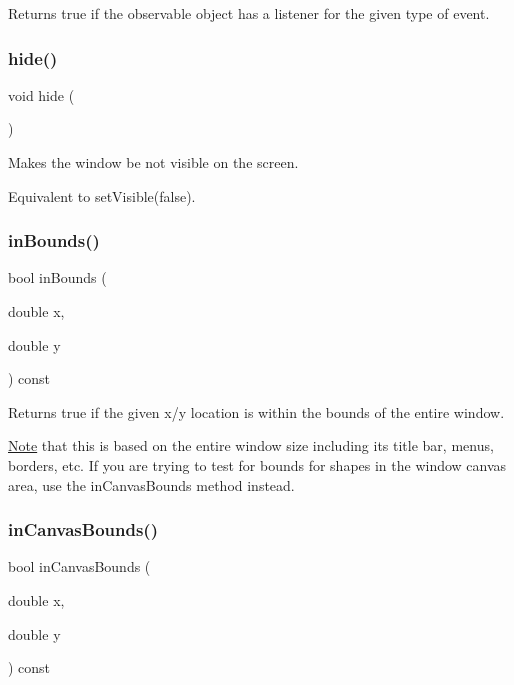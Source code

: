 Returns true if the observable object has a listener for the given type of event. 

\mbox{\label{classGWindow_ade42eb4da4eb77db85a8d1e4b92e7be4}} 
\subsubsection{\texorpdfstring{hide()}{hide()}}
{\footnotesize\ttfamily void hide (\begin{DoxyParamCaption}{ }\end{DoxyParamCaption})\hspace{0.3cm}{\ttfamily [virtual]}}



Makes the window be not visible on the screen. 

Equivalent to set\+Visible(false). \mbox{\label{classGWindow_afc480f652b8c5f1fb255e2269ce68879}} 
\subsubsection{\texorpdfstring{in\+Bounds()}{inBounds()}}
{\footnotesize\ttfamily bool in\+Bounds (\begin{DoxyParamCaption}\item[{double}]{x,  }\item[{double}]{y }\end{DoxyParamCaption}) const\hspace{0.3cm}{\ttfamily [virtual]}}



Returns true if the given x/y location is within the bounds of the entire window. 

\mbox{\hyperlink{classNote}{Note}} that this is based on the entire window size including its title bar, menus, borders, etc. If you are trying to test for bounds for shapes in the window canvas area, use the in\+Canvas\+Bounds method instead. \mbox{\label{classGWindow_ae94c9ea850cba190c985dae9fc120d32}} 
\subsubsection{\texorpdfstring{in\+Canvas\+Bounds()}{inCanvasBounds()}}
{\footnotesize\ttfamily bool in\+Canvas\+Bounds (\begin{DoxyParamCaption}\item[{double}]{x,  }\item[{double}]{y }\end{DoxyParamCaption}) const\hspace{0.3cm}{\ttfamily [virtual]}}



